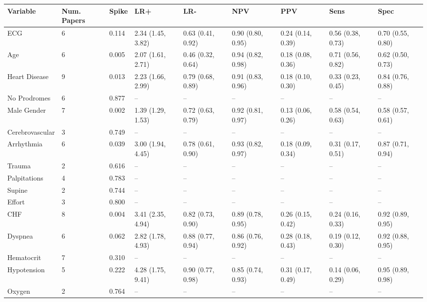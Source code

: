 \begin{table}[ht]
\centering
\begin{tabular}{lllllllll}
  \hline
Variable & Num. Papers & Spike & LR+ & LR- & NPV & PPV & Sens & Spec \\ 
  \hline
ECG & 6 & 0.114 & 2.34 (1.45, 3.82) & 0.63 (0.41, 0.92) & 0.90 (0.80, 0.95) & 0.24 (0.14, 0.39) & 0.56 (0.38, 0.73) & 0.70 (0.55, 0.80) \\ 
  Age & 6 & 0.005 & 2.07 (1.61, 2.71) & 0.46 (0.32, 0.64) & 0.94 (0.82, 0.98) & 0.18 (0.08, 0.36) & 0.71 (0.56, 0.82) & 0.62 (0.50, 0.73) \\ 
  Heart Disease & 9 & 0.013 & 2.23 (1.66, 2.99) & 0.79 (0.68, 0.89) & 0.91 (0.83, 0.96) & 0.18 (0.10, 0.30) & 0.33 (0.23, 0.45) & 0.84 (0.76, 0.88) \\ 
  No Prodromes & 6 & 0.877 & -- & -- & -- & -- & -- & -- \\ 
  Male Gender & 7 & 0.002 & 1.39 (1.29, 1.53) & 0.72 (0.63, 0.79) & 0.92 (0.81, 0.97) & 0.13 (0.06, 0.26) & 0.58 (0.54, 0.63) & 0.58 (0.57, 0.61) \\ 
  Cerebrovascular & 3 & 0.749 & -- & -- & -- & -- & -- & -- \\ 
  Arrhythmia & 6 & 0.039 & 3.00 (1.94, 4.45) & 0.78 (0.61, 0.90) & 0.93 (0.82, 0.97) & 0.18 (0.09, 0.34) & 0.31 (0.17, 0.51) & 0.87 (0.71, 0.94) \\ 
  Trauma & 2 & 0.616 & -- & -- & -- & -- & -- & -- \\ 
  Palpitations & 4 & 0.783 & -- & -- & -- & -- & -- & -- \\ 
  Supine & 2 & 0.744 & -- & -- & -- & -- & -- & -- \\ 
  Effort & 3 & 0.800 & -- & -- & -- & -- & -- & -- \\ 
  CHF & 8 & 0.004 & 3.41 (2.35, 4.94) & 0.82 (0.73, 0.90) & 0.89 (0.78, 0.95) & 0.26 (0.15, 0.42) & 0.24 (0.16, 0.33) & 0.92 (0.89, 0.95) \\ 
  Dyspnea & 6 & 0.062 & 2.82 (1.78, 4.93) & 0.88 (0.77, 0.94) & 0.86 (0.76, 0.92) & 0.28 (0.18, 0.43) & 0.19 (0.12, 0.30) & 0.92 (0.88, 0.95) \\ 
  Hematocrit & 7 & 0.310 & -- & -- & -- & -- & -- & -- \\ 
  Hypotension & 5 & 0.222 & 4.28 (1.75, 9.41) & 0.90 (0.77, 0.98) & 0.85 (0.74, 0.93) & 0.31 (0.17, 0.49) & 0.14 (0.06, 0.29) & 0.95 (0.89, 0.98) \\ 
  Oxygen & 2 & 0.764 & -- & -- & -- & -- & -- & -- \\ 

\end{tabular}
\end{table}
